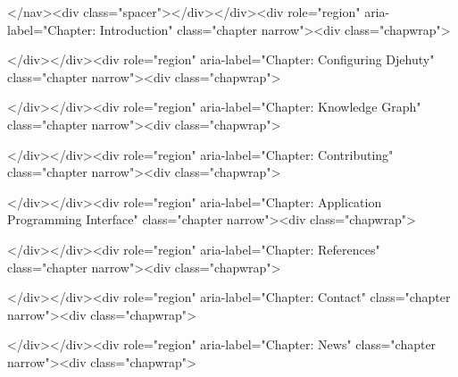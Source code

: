 \documentclass[12pt,a4paper]{book}
\begin{document}
{{{{{{\ifdefined\HCode
\begin{html}
</nav><div class="spacer"></div></div><div role="region" aria-label="Chapter: Introduction" class="chapter narrow"><div class="chapwrap">
\end{html}
\fi



\ifdefined\HCode
\begin{html}
</div></div><div role="region" aria-label="Chapter: Configuring Djehuty" class="chapter narrow"><div class="chapwrap">
\end{html}
\fi



\ifdefined\HCode
\begin{html}
</div></div><div role="region" aria-label="Chapter: Knowledge Graph" class="chapter narrow"><div class="chapwrap">
\end{html}
\fi



\ifdefined\HCode
\begin{html}
</div></div><div role="region" aria-label="Chapter: Contributing" class="chapter narrow"><div class="chapwrap">
\end{html}
\fi



\ifdefined\HCode
\begin{html}
</div></div><div role="region" aria-label="Chapter: Application Programming Interface" class="chapter narrow"><div class="chapwrap">
\end{html}
\fi



\ifdefined\HCode
\begin{html}
</div></div><div role="region" aria-label="Chapter: References" class="chapter narrow"><div class="chapwrap">
\end{html}
\fi



\ifdefined\HCode
\begin{html}
</div></div><div role="region" aria-label="Chapter: Contact" class="chapter narrow"><div class="chapwrap">
\end{html}
\fi



\ifdefined\HCode
\begin{html}
</div></div><div role="region" aria-label="Chapter: News" class="chapter narrow"><div class="chapwrap">
\end{html}
\fi

}}}}}}
\end{document}
